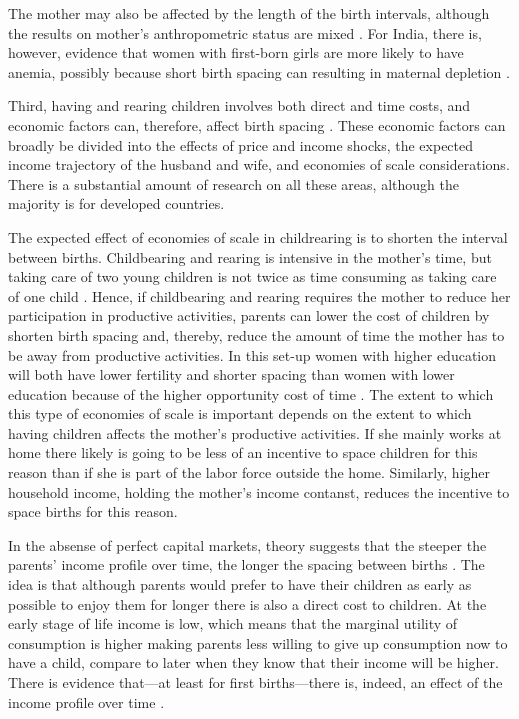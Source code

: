 The mother may also be affected by the length of the birth intervals, although the
results on mother's anthropometric status are mixed \citep{Dewey2007,Conde-Agudelo2012}.
For India, there is, however, evidence that women with first-born girls are more likely to 
have anemia, possibly because short birth spacing can resulting in maternal depletion 
\citep{Milazzo2018}.

Third, having and rearing children involves both direct and time costs, and economic factors 
can, therefore, affect birth spacing \citep{Hotz1997,Schultz1997}.
These economic factors can broadly be divided into 
the effects of price and income shocks,
the expected income trajectory of the husband and wife,
and economies of scale considerations.
There is a substantial amount of research on all these areas, although the majority is for
developed countries.

The expected effect of economies of scale in childrearing is to shorten the interval between 
births.
Childbearing and rearing is intensive in the mother's time, but taking care of two young
children is not twice as time consuming as taking care of one child 
\citep{Vijverberg1982,Espenshade1984}.
Hence, if childbearing and rearing requires the mother to reduce her participation in productive 
activities, parents can lower the cost of children by shorten birth spacing and, thereby, reduce
the amount of time the mother has to be away from productive activities.
In this set-up women with higher education will both have lower fertility and shorter
spacing than women with lower education because of the higher opportunity cost of time 
\citep{Ross1974,Newman1981}.
The extent to which this type of economies of scale is important depends on the extent to
which having children affects the mother's productive activities.
If she mainly works at home there likely is going to be less of an incentive to space 
children for this reason than if she is part of the labor force outside the home.
Similarly, higher household income, holding the mother's income contanst, reduces the incentive 
to space births for this reason.

In the absense of perfect capital markets, theory suggests that the steeper the parents' income 
profile over time, the longer the spacing between births 
\citep{Heckman1975,Wolpin1984,Newman1988}.
The idea is that although parents would prefer to have their children as early as possible to
enjoy them for longer there is also a direct cost to children.
At the early stage of life income is low, which means that the marginal utility of consumption 
is higher making parents less willing to give up consumption now to have a child, compare to 
later when they know that their income will be higher.
There is evidence that---at least for first births---there is, indeed, an effect of the income
profile over time \citep{Newman1984,Happel1984}.

